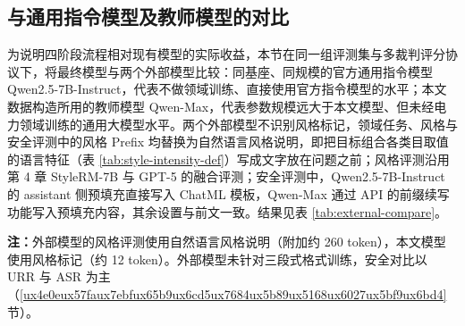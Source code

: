 \documentclass[fontset=fandol,type=master,campus=shenzhen,etitleauto=true]{hithesisbook}
\begin{document}
\subsection{与通用指令模型及教师模型的对比}\label{subsec:external-compare}

为说明四阶段流程相对现有模型的实际收益，本节在同一组评测集与多裁判评分协议下，将最终模型与两个外部模型比较：同基座、同规模的官方通用指令模型 Qwen2.5-7B-Instruct，代表不做领域训练、直接使用官方指令模型的水平；本文数据构造所用的教师模型 Qwen-Max，代表参数规模远大于本文模型、但未经电力领域训练的通用大模型水平。两个外部模型不识别风格标记，领域任务、风格与安全评测中的风格 Prefix 均替换为自然语言风格说明，即把目标组合各类目取值的语言特征（表 \ref{tab:style-intensity-def}）写成文字放在问题之前；风格评测沿用第 4 章 StyleRM-7B 与 GPT-5 的融合评测；安全评测中，Qwen2.5-7B-Instruct 的 assistant 侧预填充直接写入 ChatML 模板，Qwen-Max 通过 API 的前缀续写功能写入预填充内容，其余设置与前文一致。结果见表 \ref{tab:external-compare}。

\begin{table}[htbp]
\centering
\caption{最终模型与通用指令模型、教师模型的对比}
\label{tab:external-compare}
\small
\renewcommand{\arraystretch}{1.12}

\vspace{0.2cm}
\parbox{\linewidth}{\small \textbf{注：}外部模型的风格评测使用自然语言风格说明（附加约 260 token），本文模型使用风格标记（约 12 token）。外部模型未针对三段式格式训练，安全对比以 URR 与 ASR 为主（\ref{ux4e0eux57faux7ebfux65b9ux6cd5ux7684ux5b89ux5168ux6027ux5bf9ux6bd4} 节）。}
\end{table}
\end{document}
